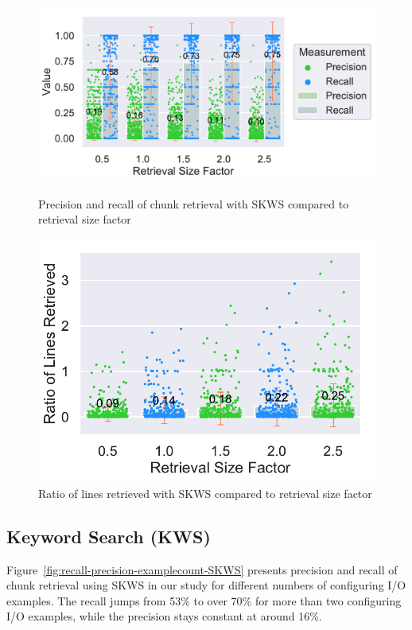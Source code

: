 \documentclass[\myrootdir/main.tex]{subfiles}
\begin{document}
\begin{figure}[htbp]
	\centering
	\begin{minipage}{0.45\textwidth}
		\centering
		\includegraphics[width=\textwidth, clip]{img/big-study/contextsizefactor-precision-recall-SKWS.pdf}
		\caption{Precision and recall of chunk retrieval with SKWS compared to retrieval size factor}
		\label{fig:contextsizefactor-precision-recall-SKWS}
	\end{minipage}\hfill
	\begin{minipage}{0.45\textwidth}
		\centering
		\includegraphics[width=\textwidth, clip]{img/big-study/retrievalsizefactor-retrievalratio-SKWS.pdf}
		\caption{Ratio of lines retrieved with SKWS compared to retrieval size factor}
		\label{fig:retrievalsizefactor-retrievalratio-SKWS}
	\end{minipage}
\end{figure}


\subsection{Keyword Search (KWS)}
Figure~\ref{fig:recall-precision-examplecount-SKWS} presents precision and recall of chunk retrieval using SKWS in our study for different numbers of configuring I/O examples.
The recall jumps from 53\% to over 70\% for more than two configuring I/O examples, while the precision stays constant at around 16\%.
\end{document}
